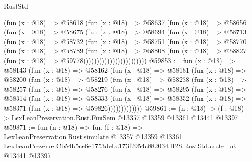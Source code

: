 \begin{lexlean}{RustStd}
\begin{coremodule}
                          (fun (x : @18) =>
                          @58618
                            (fun (x : @18) =>
                            @58637
                              (fun (x : @18) =>
                              @58656
                                (fun (x : @18) =>
                                @58675
                                  (fun (x : @18) =>
                                  @58694
                                    (fun (x : @18) =>
                                    @58713
                                      (fun (x : @18) =>
                                      @58732
                                        (fun (x : @18) =>
                                        @58751
                                          (fun (x : @18) =>
                                          @58770
                                            (fun (x : @18) =>
                                            @58789
                                              (fun (x : @18) =>
                                              @58808
                                                (fun (x : @18) =>
                                                @58827
                                                  (fun (x : @18) => @59778))))))))))))))))))))))))
@59853 := fun (x : @18) =>
  @58143
    (fun (x : @18) =>
    @58162
      (fun (x : @18) =>
      @58181
        (fun (x : @18) =>
        @58200
          (fun (x : @18) =>
          @58219
            (fun (x : @18) =>
            @58238
              (fun (x : @18) =>
              @58257
                (fun (x : @18) =>
                @58276
                  (fun (x : @18) =>
                  @58295
                    (fun (x : @18) =>
                    @58314
                      (fun (x : @18) =>
                      @58333
                        (fun (x : @18) =>
                        @58352 (fun (x : @18) => @58371 (fun (x : @18) => @59826)))))))))))))
@59861 := (n : @18) ->
  (f : @18) -> LexLeanPreservation.Rust.FunSem @13357 @13359 @13361 @13441 @13397
@59871 := fun (n : @18) =>
  fun (f : @18) =>
  LexLeanPreservation.Rust.simulate
    @13357
    @13359
    @13361
    LexLeanPreserve.Cb54b5ce6e1753deba173f2954c882034.R28.RustStd.crate_ok
    @13441
    @13397
\end{coremodule}
\end{lexlean}
